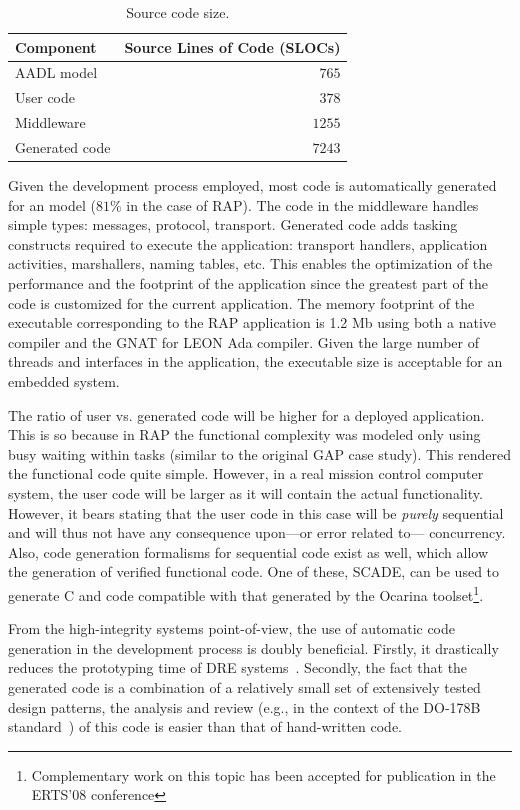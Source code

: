 \begin{table}
\centering
\begin{tabular}{|l|r|}
\hline
\textbf{Component} & \textbf{Source Lines of Code (SLOCs)}\\
\hline
AADL model         & $765$\\
User code          & $378$\\
Middleware         & $1255$\\
Generated code     & $7243$\\
\hline
\end{tabular}
\caption{Source code size.}
\label{SLOCs}
\end{table}

Given the development process employed, most code is automatically
generated for an \aadl{} model ($81\%$ in the case of RAP). The code
in the middleware handles simple types: messages, protocol,
transport. Generated code adds tasking constructs required to execute
the application: transport handlers, application activities,
marshallers, naming tables, etc. This enables the optimization of the
performance and the footprint of the application since the greatest
part of the code is customized for the current application. The memory
footprint of the executable corresponding to the RAP application is
1.2 Mb using both a native \ada compiler and the GNAT for LEON Ada
compiler. Given the large number of threads and interfaces in the
application, the executable size is acceptable for an embedded system.

The ratio of user vs. generated code will be higher for a deployed
application. This is so because in RAP the functional complexity was
modeled only using busy waiting within tasks (similar to the original
GAP case study). This rendered the functional code quite
simple. However, in a real mission control computer system, the user
code will be larger as it will contain the actual
functionality. However, it bears stating that the user code in this
case will be \emph{purely} sequential and will thus not have any
consequence upon---or error related to--- concurrency. Also, code
generation formalisms for sequential code exist as well, which allow
the generation of verified functional code. One of these, SCADE, can
be used to generate C and \ada code compatible with that generated by
the Ocarina toolset\footnote{Complementary work on this topic has been
  accepted for publication in the ERTS'08 conference}.

From the high-integrity systems point-of-view, the use of automatic
code generation in the development process is doubly
beneficial. Firstly, it drastically reduces the prototyping time of
DRE systems~\cite{hugues@rsp07}. Secondly, the fact that the generated
code is a combination of a relatively small set of extensively tested
design patterns, the analysis and review (e.g., in the context of the
DO-178B standard~\cite{do178b}) of this code is easier than that of
hand-written code.

